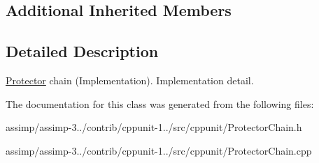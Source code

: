 \subsection*{Additional Inherited Members}


\subsection{Detailed Description}
\hyperlink{class_protector}{Protector} chain (Implementation). Implementation detail. 

The documentation for this class was generated from the following files\+:\begin{DoxyCompactItemize}
\item 
assimp/assimp-\/3../contrib/cppunit-\/1../src/cppunit/Protector\+Chain.\+h\item 
assimp/assimp-\/3../contrib/cppunit-\/1../src/cppunit/Protector\+Chain.\+cpp\end{DoxyCompactItemize}
